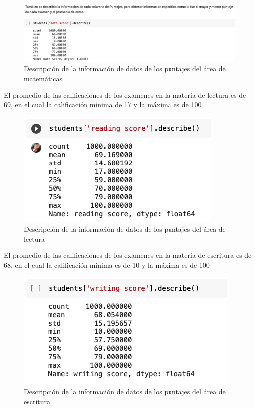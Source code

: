 \documentclass[conference,compsoc,onecolumn]{IEEEtran}
\begin{document}
     \begin{figure}[H]       
            \centering
            \includegraphics[scale = 0.50]{5.png}
            \caption{Descripción de la información de datos de los puntajes del área de matemáticas}
            \label{subfigura8}
        \end{figure}
    El promedio de las calificaciones de los examenes en la materia de lectura es de 69, en el cual la calificación mínima de 17 y la máxima es de 100
         \begin{figure}[H]       
            \centering
            \includegraphics[scale = 0.50]{6.png}
            \caption{Descripción de la información de datos de los puntajes del área de lectura}
            \label{subfigura11}
        \end{figure}
    El promedio de las calificaciones de los examenes en la materia de escritura es de 68, en el cual la calificación mínima es de 10 y la máxima es de 100
         \begin{figure}[H]       
            \centering
            \includegraphics[scale = 0.50]{8.png}
            \caption{Descripción de la información de datos de los puntajes del área de escritura}
            \label{subfigura12}
        \end{figure}
\end{document}
